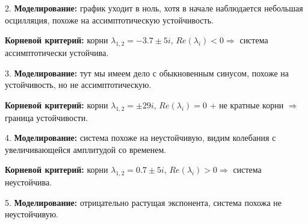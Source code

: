 \begin{par}
\begin{flushleft}
2. \textbf{Моделирование: }график уходит в ноль, хотя в начале наблюдается небольшая осцилляция, похоже на ассимптотическую устойчивость.
\end{flushleft}
\end{par}

\begin{par}
\begin{flushleft}
   \textbf{Корневой критерий:} корни $\lambda_{1,2} =-3.7\pm 5i$, $Re(\lambda_i )<0\Rightarrow$ система ассимптотически устойчива.
\end{flushleft}
\end{par}

\begin{par}
\begin{flushleft}
3.  \textbf{Моделирование: }тут мы имеем дело с обыкновенным синусом, похоже на устойчивость, но не ассимптотическую.
\end{flushleft}
\end{par}

\begin{par}
\begin{flushleft}
   \textbf{Корневой критерий:} корни $\lambda_{1,2} =\pm 29i$, $Re(\lambda_i )=0$ + не кратные корни $\Rightarrow$ граница устойчивости.
\end{flushleft}
\end{par}

\begin{par}
\begin{flushleft}
4.  \textbf{Моделирование: }система похоже на неустойчивую, видим колебания с увеличивающейся амплитудой со временем.
\end{flushleft}
\end{par}

\begin{par}
\begin{flushleft}
   \textbf{Корневой критерий:} корни $\lambda_{1,2} =0.7\pm 5i$, $Re(\lambda_i )>0\Rightarrow$ система неустойчива.
\end{flushleft}
\end{par}

\begin{par}
\begin{flushleft}
5.  \textbf{Моделирование: }отрицательно растущая экспонента, система похожа не неустойчивую.
\end{flushleft}
\end{par}

